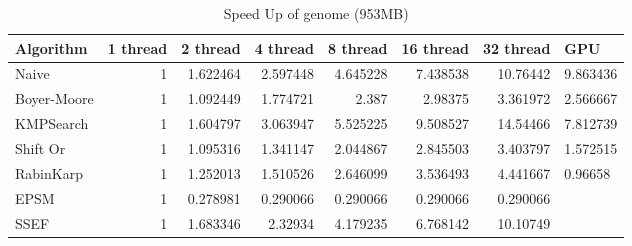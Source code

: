 \documentclass[11pt]{article}       %
\begin{document}
\begin{table}[htbp]
  \centering
  \caption{Speed Up of genome (953MB)}
    \begin{tabular}{lrrrrrr}\label{t8}
Algorithm & 1 thread & 2 thread & 4 thread & 8 thread & 16 thread & 32 thread & GPU \\
 \hline
    Naive & 1     & 1.622464 & 2.597448 & 4.645228 & 7.438538 & 10.76442 & 9.863436 \\
    Boyer-Moore & 1     & 1.092449 & 1.774721 & 2.387 & 2.98375 & 3.361972 & 2.566667 \\
    KMPSearch & 1     & 1.604797 & 3.063947 & 5.525225 & 9.508527 & 14.54466 & 7.812739 \\
    Shift Or & 1     & 1.095316 & 1.341147 & 2.044867 & 2.845503 & 3.403797 & 1.572515 \\
    RabinKarp & 1     & 1.252013 & 1.510526 & 2.646099 & 3.536493 & 4.441667 & 0.96658 \\
    EPSM  & 1     & 0.278981 & 0.290066 & 0.290066 & 0.290066 & 0.290066 &  \\
    SSEF  & 1     & 1.683346 & 2.32934 & 4.179235 & 6.768142 & 10.10749 &  \\

    \end{tabular}%
  \label{tab:addlabel}%
\end{table}%
\end{document}
